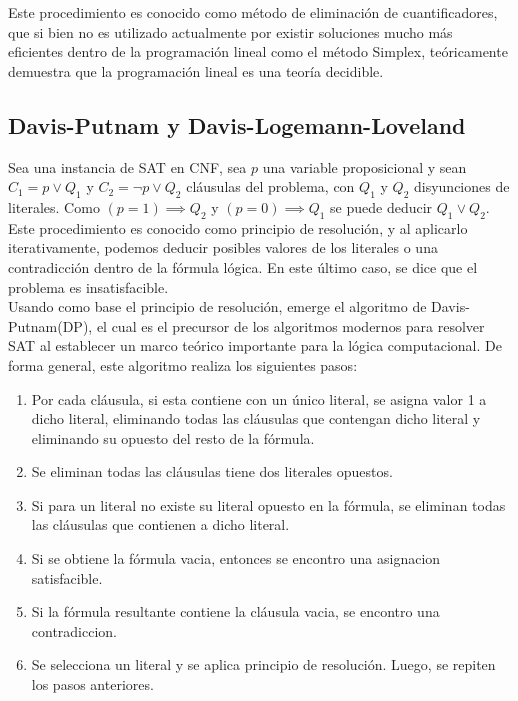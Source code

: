 \documentclass[12pt]{report}
\begin{document}
Este procedimiento es conocido como método de eliminación de cuantificadores, que si bien no es utilizado actualmente por existir soluciones mucho más eficientes dentro de la programación lineal como el método Simplex, teóricamente demuestra que la programación lineal es una teoría decidible.

\subsection{Davis-Putnam y Davis-Logemann-Loveland}

Sea una instancia de SAT en CNF, sea $p$ una variable proposicional y sean $C_1=p \lor  Q_1$  y  $C_2 = \neg p \lor  Q_2$ cláusulas del problema, con $Q_1$ y $Q_2$ disyunciones de literales. Como $(p=1)\implies  Q_2$ y $(p=0)\implies  Q_1$ se puede deducir $Q_1\lor  Q_2$. Este procedimiento es conocido como principio de resolución, y al aplicarlo iterativamente, podemos deducir posibles valores de los literales o una contradicción dentro de la fórmula lógica. En este último caso, se dice que el problema es insatisfacible.\\ 

Usando como base el principio de resolución, emerge el algoritmo de Davis-Putnam(DP), el cual es el precursor de los algoritmos modernos para resolver SAT al establecer  un marco teórico importante para la lógica computacional. De forma general, este algoritmo realiza los siguientes pasos:
\begin{enumerate}
    \item Por cada cláusula, si esta contiene con un único literal, se asigna valor 1 a dicho literal, eliminando todas las cláusulas que contengan dicho literal y eliminando su opuesto del resto de la fórmula.
    \item Se eliminan todas las cláusulas tiene dos literales opuestos.
    \item Si para un literal no existe su literal opuesto en la fórmula, se eliminan todas las cláusulas que contienen a dicho literal.
    \item Si se obtiene la fórmula vacia, entonces se encontro una asignacion satisfacible. 
    \item Si la fórmula resultante contiene la cláusula vacia, se encontro una contradiccion.
    \item Se selecciona un literal y se aplica principio de resolución. Luego, se repiten los pasos anteriores.
\end{enumerate}
\end{document}
